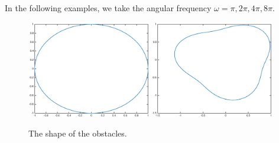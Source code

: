 In the following examples, we take the angular frequency $\omega= \pi,2\pi,4\pi,8\pi$.

\begin{figure}[htbp]
	\centering
	\includegraphics[width=0.48\textwidth]{./Img/figure_sc_elastic/circle.eps}
	\includegraphics[width=0.48\textwidth]{./Img/figure_sc_elastic/pear.eps}
	\caption{The shape of the obstacles.}\label{shape}
\end{figure}




